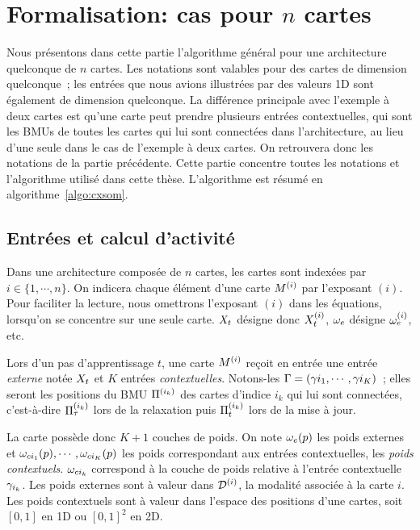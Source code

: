 \documentclass[../main]{subfiles}
\begin{document}
\section{Formalisation: cas pour $n$ cartes}\label{sec:formalisme}

Nous présentons dans cette partie l'algorithme général pour une architecture quelconque de $n$ cartes. 
Les notations sont valables pour des cartes de dimension quelconque~; les entrées que nous avions illustrées par des valeurs 1D sont également de dimension quelconque.
La différence principale avec l'exemple à deux cartes est qu'une carte peut prendre plusieurs entrées contextuelles, qui sont les BMUs de toutes les cartes qui lui sont connectées dans l'architecture, au lieu d'une seule dans le cas de l'exemple à deux cartes. On retrouvera donc les notations de la partie précédente.
Cette partie concentre toutes les notations et l'algorithme utilisé dans cette thèse. 
L'algorithme est résumé en algorithme~\ref{algo:cxsom}.

\subsection{Entrées et calcul d'activité}

Dans une architecture composée de $n$ cartes, les cartes sont indexées par $i \in \{1,\cdots,n\}$. On indicera chaque élément d'une carte $M^{({i})}$ par l'exposant $(i)$.
Pour faciliter la lecture, nous omettrons l'exposant $(i)$ dans les équations, lorsqu'on se concentre sur une seule carte. $X_t$ désigne donc $X_t^{({i})}$, $\omega_e$ désigne $\omega_e^{({i})}$, etc.

Lors d'un pas d'apprentissage $t$, une carte $M^{({i})}$ reçoit en entrée une entrée \emph{externe} notée $X_t$ et $K$ entrées \emph{contextuelles}. Notons-les $\Gamma = (\gamma{i_1},\cdots,\gamma{i_K})$~; elles seront les positions du BMU $\Pi^{({i_k})}$ des cartes d'indice $i_k$ qui lui sont connectées, c'est-à-dire $\Pi^{({i_k})}_\tau$ lors de la relaxation puis $\Pi^{({i_k})}_t$ lors de la mise à jour.

La carte possède donc $K+1$ couches de poids. On note $\omega_e(p)$ les poids externes et $\omega_{ci_1}(p), \cdots, \omega_{ci_K}(p)$ les poids correspondant aux entrées contextuelles, les \emph{poids contextuels}.
$\omega_{ci_k}$ correspond à la couche de poids relative à l'entrée contextuelle $\gamma_{i_k}$. Les poids externes sont à valeur dans $\mathcal{D}^{({i})}$, la modalité associée à la carte $i$. Les poids contextuels sont à valeur dans l'espace des positions d'une cartes, soit $[0,1]$ en 1D ou $[0,1]^2$ en 2D.
\end{document}
